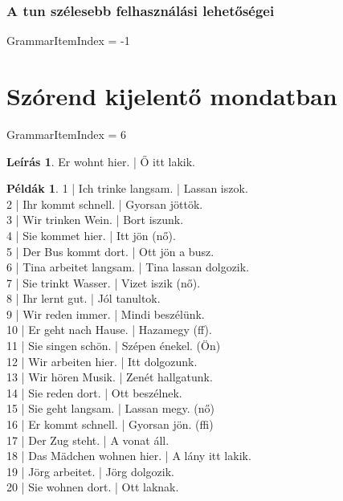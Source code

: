 \documentclass{article}
\theoremstyle{definition}
\newtheorem*{exmp}{Példák}
\newtheorem*{desc}{Leírás}
\begin{document}
\subsubsection{A tun szélesebb felhasználási lehetőségei}

GrammarItemIndex = -1

\section{Szórend kijelentő mondatban}

GrammarItemIndex = 6

\begin{desc}
Er wohnt hier. | Ő itt lakik.
\end{desc}

\begin{exmp}
1 | Ich trinke langsam. | Lassan iszok.\\
2 | Ihr kommt schnell. | Gyorsan jöttök.\\
3 | Wir trinken Wein. | Bort iszunk.\\
4 | Sie kommet hier. | Itt jön (nő).\\
5 | Der Bus kommt dort. | Ott jön a busz.\\
6 | Tina arbeitet langsam. | Tina lassan dolgozik.\\
7 | Sie trinkt Wasser. | Vizet iszik (nő).\\
8 | Ihr lernt gut. | Jól tanultok.\\
9 | Wir reden immer. | Mindi beszélünk.\\
10 | Er geht nach Hause. | Hazamegy (ff).\\
11 | Sie singen schön. | Szépen énekel. (Ön)\\
12 | Wir arbeiten hier. | Itt dolgozunk.\\
13 | Wir hören Musik. | Zenét hallgatunk.\\
14 | Sie reden dort. | Ott beszélnek.\\
15 | Sie geht langsam. | Lassan megy. (nő)\\
16 | Er kommt schnell. | Gyorsan jön. (ffi)\\
17 | Der Zug steht. | A vonat áll.\\
18 | Das Mädchen wohnen hier. | A lány itt lakik.\\
19 | Jörg arbeitet. | Jörg dolgozik.\\
20 | Sie wohnen dort. | Ott laknak.\\
\end{exmp}
\end{document}
